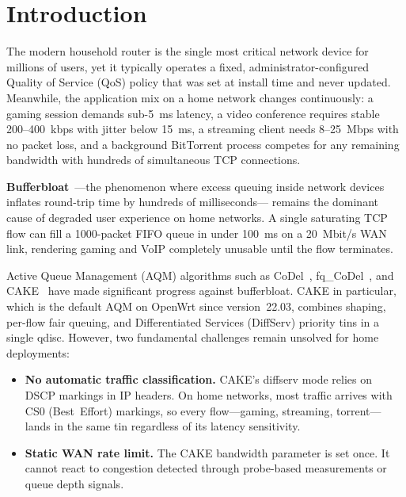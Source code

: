 \documentclass[conference]{IEEEtran}
\begin{document}
\section{Introduction}

The modern household router is the single most critical network device
for millions of users, yet it typically operates a fixed, administrator-configured
Quality of Service (QoS) policy that was set at install time and never updated.
Meanwhile, the application mix on a home network changes continuously:
a gaming session demands sub-5~ms latency, a video conference requires
stable 200--400~kbps with jitter below 15~ms, a streaming client needs
8--25~Mbps with no packet loss, and a background BitTorrent process competes for
any remaining bandwidth with hundreds of simultaneous TCP connections.

\textbf{Bufferbloat}~\cite{gettys2012}—the phenomenon where excess queuing
inside network devices inflates round-trip time by hundreds of milliseconds—
remains the dominant cause of degraded user experience on home networks.
A single saturating TCP flow can fill a 1000-packet FIFO queue in under
100~ms on a 20~Mbit/s WAN link, rendering gaming and VoIP completely
unusable until the flow terminates.

Active Queue Management (AQM) algorithms such as
CoDel~\cite{nichols2012}, fq\_CoDel~\cite{hoeiland2018}, and
CAKE~\cite{cake2018} have made significant progress against bufferbloat.
CAKE in particular, which is the default AQM on OpenWrt since version~22.03,
combines shaping, per-flow fair queuing, and Differentiated Services (DiffServ)
priority tins in a single qdisc.
However, two fundamental challenges remain unsolved for home deployments:

\begin{itemize}
  \item \textbf{No automatic traffic classification.} CAKE's diffserv mode
    relies on DSCP markings in IP headers. On home networks, most traffic
    arrives with CS0 (Best~Effort) markings, so every flow—gaming, streaming,
    torrent—lands in the same tin regardless of its latency sensitivity.
  \item \textbf{Static WAN rate limit.} The CAKE bandwidth parameter is set
    once. It cannot react to congestion detected through probe-based
    measurements or queue depth signals.
\end{itemize}
\end{document}

